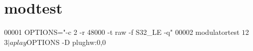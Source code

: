 \hypertarget{modtest_source}{\section{modtest}
\label{modtest_source}
}

\begin{DoxyCode}
00001 OPTIONS="-c 2 -r 48000 -t raw -f S32\_LE -q"
00002 modulatortest $1 $2 $3 | aplay $OPTIONS -D plughw:0,0
\end{DoxyCode}
